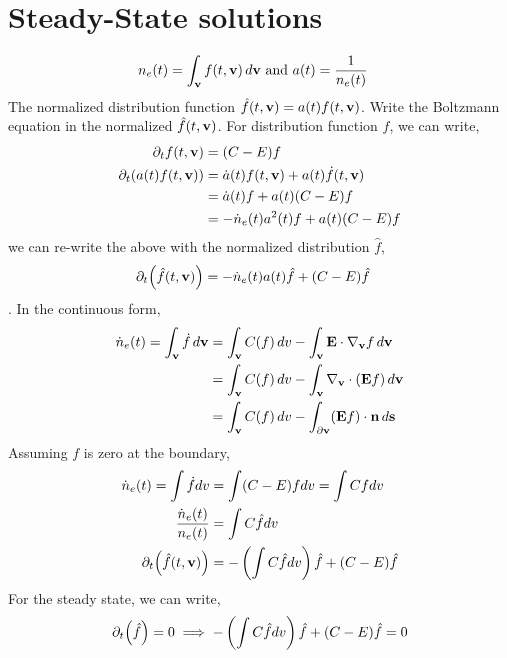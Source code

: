\documentclass{article}[draft]
\begin{document}
\section{Steady-State solutions}
\begin{align*}
n_e(t) &= \int_{\mathbf{v}} f(t, \mathbf{v}) \, d\mathbf{v} \text{ and } a(t) = \frac{1}{n_e(t)}
\end{align*}
The normalized distribution function $\hat{f}(t,\mathbf{v}) = a(t) f(t, \mathbf{v})$. Write the Boltzmann equation in the normalized $\hat{f}(t, \mathbf{v})$. For distribution function $f$, we can write, 
\begin{align*}
\partial_t f\of{t,\vect{v}} &= (C-E)f \\
\partial_t\of{a\of{t} f\of{t,\vect{v}}} &= \dot{a}\of{t}f\of{t,\vect{v}} + a\of{t} \dot{f}\of{t,\vect{v}} \\
&= \dot{a}\of{t}f + a\of{t} (C-E)f \\
&= -\dot{n}_e\of{t} a^2\of{t} f + a\of{t} (C-E)f \\
\end{align*}
we can re-write the above with the normalized distribution $\hat{f}$, 
\begin{align*}
\partial_t\of{\hat{f}(t,\vect{v})} &=-\dot{n}_e\of{t} a\of{t} \hat{f} + (C-E)\hat{f}
\end{align*}. In the continuous form, 
\begin{align*}
\dot{n}_e (t) = \int_{\mathbf{v}} \dot{f} \, d\mathbf{v} &= \int_{\mathbf{v}} C(f) \, dv - \int_{\mathbf{v}} \mathbf{E} \cdot \nabla_{\mathbf{v}} f \, d\mathbf{v} \\
&= \int_{\mathbf{v}} C(f) \, dv -\int_{\mathbf{v}} \nabla_{\mathbf{v}} \cdot (\mathbf{E} f) \, d\mathbf{v} \\
&= \int_{\mathbf{v}} C(f) \, dv -\int_{\partial\mathbf{v}} (\mathbf{E} f) \cdot \mathbf{n} \, d\mathbf{s}
\end{align*} Assuming $f$ is zero at the boundary, 
\begin{align*}
\dot{n}_e (t) = \int \dot{f} dv &= \int (C-E) f dv = \int C f dv \\
\frac{\dot{n}_e (t)}{n_e(t)} &=\int C \hat{f} dv \\
\partial_t\of{\hat{f}(t,\vect{v})} &=-\left(\int C \hat{f} dv \right) \hat{f} + (C-E)\hat{f}
\end{align*}
For the steady state, we can write, 
\begin{align*}
\partial_t\of{\hat{f}} &=0 \implies -\left(\int C \hat{f} dv \right) \hat{f} + (C-E)\hat{f} =0 \\ 
\end{align*}
\end{document}
